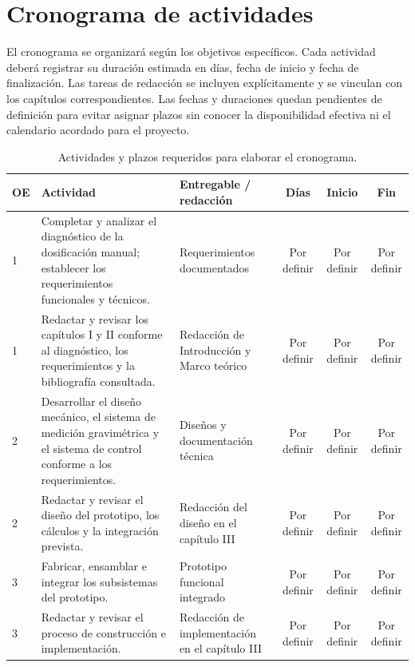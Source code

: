 \section{Cronograma de actividades}
\label{sec:cronograma_actividades}

El cronograma se organizará según los objetivos específicos. Cada actividad
deberá registrar su duración estimada en días, fecha de inicio y fecha de
finalización. Las tareas de redacción se incluyen explícitamente y se vinculan
con los capítulos correspondientes. Las fechas y duraciones quedan pendientes
de definición para evitar asignar plazos sin conocer la disponibilidad efectiva
ni el calendario acordado para el proyecto.

\begin{table}[htbp]
    \centering
    \caption{Actividades y plazos requeridos para elaborar el cronograma.}
    \label{tab:actividades_cronograma}
    \small
    \setlength{\tabcolsep}{4pt}
    \renewcommand{\arraystretch}{1.25}
    \begin{tabularx}{\textwidth}{@{}p{}X p{} c c c@{}}
        \toprule
        \textbf{OE} & \textbf{Actividad} & \textbf{Entregable / redacción} &
        \textbf{Días} & \textbf{Inicio} & \textbf{Fin} \\
        \midrule
        1 & Completar y analizar el diagnóstico de la dosificación manual; establecer los requerimientos funcionales y técnicos. & Requerimientos documentados & Por definir & Por definir & Por definir \\
        1 & Redactar y revisar los capítulos I y II conforme al diagnóstico, los requerimientos y la bibliografía consultada. & Redacción de Introducción y Marco teórico & Por definir & Por definir & Por definir \\
        2 & Desarrollar el diseño mecánico, el sistema de medición gravimétrica y el sistema de control conforme a los requerimientos. & Diseños y documentación técnica & Por definir & Por definir & Por definir \\
        2 & Redactar y revisar el diseño del prototipo, los cálculos y la integración prevista. & Redacción del diseño en el capítulo III & Por definir & Por definir & Por definir \\
        3 & Fabricar, ensamblar e integrar los subsistemas del prototipo. & Prototipo funcional integrado & Por definir & Por definir & Por definir \\
        3 & Redactar y revisar el proceso de construcción e implementación. & Redacción de implementación en el capítulo III & Por definir & Por definir & Por definir \\

\end{tabularx}
\end{table}
